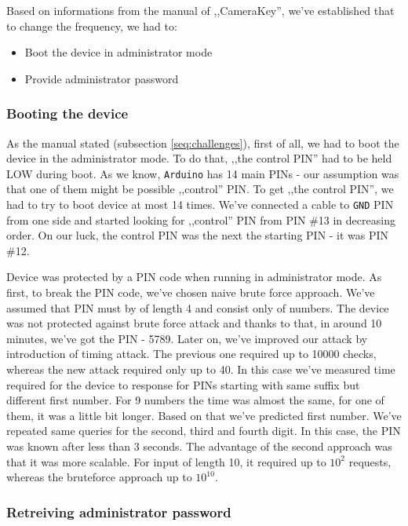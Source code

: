 Based on informations from the manual of ,,CameraKey'', we've established that to change the frequency, we had to:

\begin{itemize}
  \item Boot the device in administrator mode
  \item Provide administrator password
\end{itemize}

\subsubsection{Booting the device}

As the manual stated (subsection \ref{seq:challenges}), first of all, we had to boot the device in the administrator mode. To do that, ,,the control PIN'' had to be held LOW during boot. As we know, \texttt{Arduino} has 14 main PINs - our assumption was that one of them might be possible ,,control'' PIN.  To get ,,the control PIN'', we had to try to boot device at most 14 times. We've connected a cable to \texttt{GND} PIN from one side and started looking for ,,control'' PIN from PIN \#13 in decreasing order. On our luck, the control PIN was the next the starting PIN - it was PIN \#12.

Device was protected by a PIN code when running in administrator mode. As first, to break the PIN code, we've chosen naive brute force approach. We've assumed that PIN must by of length 4 and consist only of numbers. The device was not protected against brute force attack and thanks to that, in around 10 minutes, we've got the PIN - 5789. Later on, we've improved our attack by introduction of timing attack. The previous one required up to 10000 checks, whereas the new attack required only up to 40. In this case we've measured time required for the device to response for PINs starting with same suffix but different first number. For 9 numbers the time was almost the same, for one of them, it was a little bit longer. Based on that we've predicted first number. We've repeated same queries for the second, third and fourth digit. In this case, the PIN was known after less than 3 seconds. The advantage of the second approach was that it was more scalable. For input of length 10, it required up to $10^2$ requests, whereas the bruteforce approach up to $10 ^ {10}$.

\subsubsection{Retreiving administrator password}


